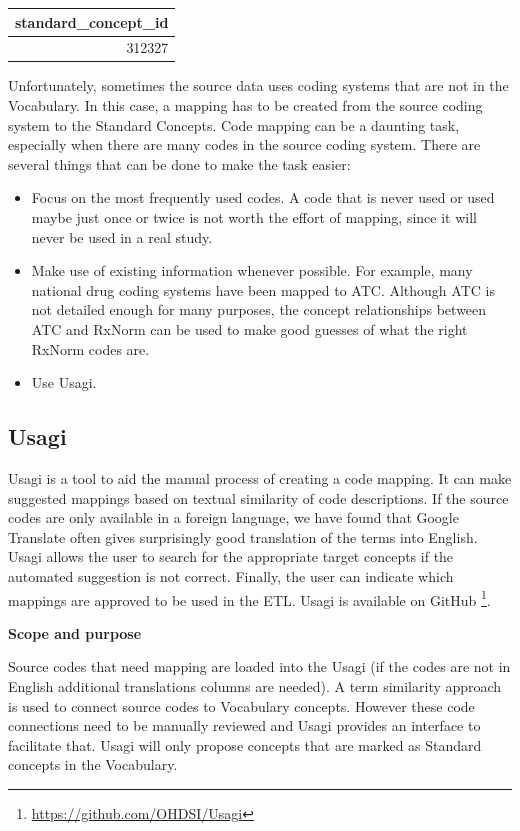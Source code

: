 \documentclass[11pt]{book}
\providecommand{\tightlist}{%
  \setlength{\itemsep}{0pt}\setlength{\parskip}{0pt}}
\let\rmarkdownfootnote\footnote%
\def\footnote{\protect\rmarkdownfootnote}
\theoremstyle{definition}
\theoremstyle{definition}
\theoremstyle{definition}
\theoremstyle{remark}
\begin{document}
\begin{longtable}[]{@{}r@{}}
\toprule
standard\_concept\_id\tabularnewline
\midrule
\endhead
312327\tabularnewline
\bottomrule
\end{longtable}

Unfortunately, sometimes the source data uses coding systems that are not in the Vocabulary. In this case, a mapping has to be created from the source coding system to the Standard Concepts. Code mapping can be a daunting task, especially when there are many codes in the source coding system. There are several things that can be done to make the task easier:

\begin{itemize}
\tightlist
\item
  Focus on the most frequently used codes. A code that is never used or used maybe just once or twice is not worth the effort of mapping, since it will never be used in a real study.
\item
  Make use of existing information whenever possible. For example, many national drug coding systems have been mapped to ATC. Although ATC is not detailed enough for many purposes, the concept relationships between ATC and RxNorm can be used to make good guesses of what the right RxNorm codes are.
\item
  Use Usagi.
\end{itemize}

\hypertarget{usagi}{%
\subsection{Usagi}\label{usagi}}

Usagi is a tool to aid the manual process of creating a code mapping. It can make suggested mappings based on textual similarity of code descriptions. If the source codes are only available in a foreign language, we have found that Google Translate often gives surprisingly good translation of the terms into English. Usagi allows the user to search for the appropriate target concepts if the automated suggestion is not correct. Finally, the user can indicate which mappings are approved to be used in the ETL. Usagi is available on GitHub \footnote{\url{https://github.com/OHDSI/Usagi}}.

\textbf{Scope and purpose}

Source codes that need mapping are loaded into the Usagi (if the codes are not in English additional translations columns are needed). A term similarity approach is used to connect source codes to Vocabulary concepts. However these code connections need to be manually reviewed and Usagi provides an interface to facilitate that. Usagi will only propose concepts that are marked as Standard concepts in the Vocabulary.
\end{document}
